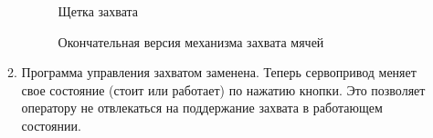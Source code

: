 \begin{enumerate}
\begin{enumerate}
      \begin{figure}[H]
      	\begin{minipage}[h]{0.47\linewidth}
      		\caption{Щетка захвата}
      	\end{minipage}
      	\hfill
      	\begin{minipage}[h]{0.47\linewidth}
      		\caption{Окончательная версия механизма захвата мячей}
      	\end{minipage}
      \end{figure}
      
      \item Программа управления захватом заменена. Теперь сервопривод меняет свое состояние (стоит или работает) по нажатию кнопки. Это позволяет оператору не отвлекаться на поддержание захвата в работающем состоянии.\newline
      

\end{enumerate}
\end{enumerate}
